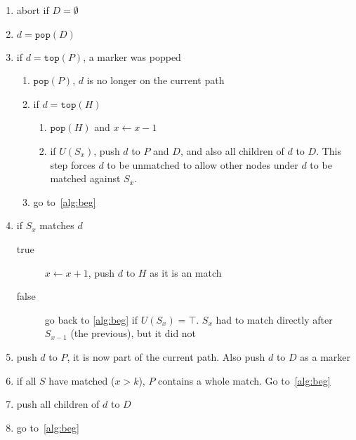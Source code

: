 \documentclass[a4paper,12pt]{article}
\begin{document}
\begin{enumerate}[noitemsep]
  \item\label{alg:beg} abort if $D = \emptyset$
  \item $d = \mathtt{pop}(D)$
  \item if $d = \mathtt{top}(P)$, a marker was popped
    \begin{enumerate}
      \item $\mathtt{pop}(P)$, $d$ is no longer on the current path
      \item if $d = \mathtt{top}(H)$
      \begin{enumerate}
        \item $\mathtt{pop}(H)$ and $x \gets x-1$
        \item if $U(S_x)$, push $d$ to $P$ and $D$, and also all children of $d$ to $D$.
        This step forces $d$ to be unmatched to allow other nodes under $d$ to
        be matched against $S_x$.
      \end{enumerate}
      \item go to~\ref{alg:beg}
    \end{enumerate}
  \item if $S_x$ matches $d$
    \begin{description}
      \item[true] $x \gets x+1$, push $d$ to $H$ as it is an match
      \item[false] go back to \ref{alg:beg} if $U(S_x) = \top$. $S_x$ had to match
      directly after $S_{x-1}$ (the previous), but it did not
    \end{description}
  \item push $d$ to $P$, it is now part of the current path. Also push $d$ to $D$ as a marker
  \item if all $S$ have matched ($x > k$), $P$ contains a whole match. Go to~\ref{alg:beg}
  \item push all children of $d$ to $D$
  \item go to~\ref{alg:beg}
\end{enumerate}
\end{document}
